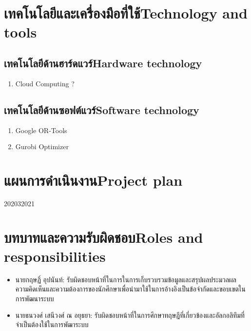 \section{\ifcpe เทคโนโลยีและเครื่องมือที่ใช้\else Technology and tools\fi}

\subsection{\ifcpe เทคโนโลยีด้านฮาร์ดแวร์\else Hardware technology\fi}
\begin{enumerate}
    \item Cloud Computing ?
\end{enumerate}
\subsection{\ifcpe เทคโนโลยีด้านซอฟต์แวร์\else Software technology\fi}
\begin{enumerate}
    \item Google OR-Tools
    \item Gurobi Optimizer
\end{enumerate}

\section{\ifcpe แผนการดำเนินงาน\else Project plan\fi}

\begin{plan}{7}{2020}{3}{2021}
\end{plan}

\section{\ifcpe บทบาทและความรับผิดชอบ\else Roles and responsibilities\fi}
\begin{itemize}
\item นายกฤษฏิ์ อุปนันท์: รับผิดชอบหน้าที่ในการในการเก็บรวบรวมข้อมูลและสรุปผลประมวลผลความคิดเห็นและความต้องการของนักศึกษาเพื่อนำมาใช้ในการอ้างอิงเป็นข้อจำกัดและขอบเขตในการพัฒนาระบบ
\item นายธนวงศ์ เสนีวงศ์ ณ อยุธยา: รับผิดชอบหน้าที่ในการศึกษาทฤษฎีที่เกี่ยวข้องและอัลกอลิทึมที่จำเป็นต้องใช้ในการพัฒาระบบ
\end{itemize}

